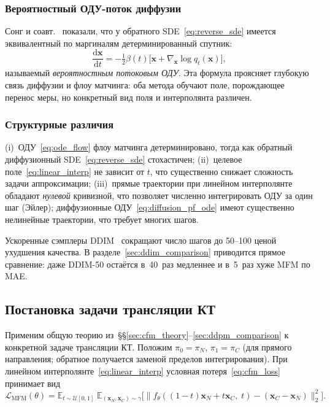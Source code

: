 \subsubsection{Вероятностный ОДУ-поток диффузии}

Сонг и соавт.~\cite{song2020score} показали, что у обратного SDE~\eqref{eq:reverse_sde} имеется эквивалентный по маргиналям детерминированный спутник:
\begin{equation}
    \frac{\mathrm{d}\mathbf{x}}{\mathrm{d}t} = -\tfrac{1}{2}\beta(t)\bigl[\mathbf{x} + \nabla_{\mathbf{x}}\log q_t(\mathbf{x})\bigr],
    \label{eq:diffusion_pf_ode}
\end{equation}
называемый \emph{вероятностным потоковым ОДУ}. Эта формула проясняет глубокую связь диффузии и флоу матчинга: оба метода обучают поле, порождающее перенос меры, но конкретный вид поля и интерполянта различен.

\subsubsection{Структурные различия}

\begin{note}
(i)~ОДУ~\eqref{eq:ode_flow} флоу матчинга детерминировано, тогда как обратный диффузионный SDE~\eqref{eq:reverse_sde} стохастичен; (ii)~целевое поле~\eqref{eq:linear_interp} не зависит от $t$, что существенно снижает сложность задачи аппроксимации; (iii)~прямые траектории при линейном интерполянте обладают \emph{нулевой} кривизной, что позволяет численно интегрировать ОДУ за один шаг (Эйлер); диффузионные ОДУ~\eqref{eq:diffusion_pf_ode} имеют существенно нелинейные траектории, что требует многих шагов.
\end{note}

Ускоренные сэмплеры DDIM~\cite{song2020denoising} сокращают число шагов до 50--100 ценой ухудшения качества. В разделе~\ref{sec:ddim_comparison} приводится прямое сравнение: даже DDIM-50 остаётся в~40~раз медленнее и в~5~раз хуже MFM по MAE.

\subsection{Постановка задачи трансляции КТ}

Применим общую теорию из~\S\S\ref{sec:cfm_theory}--\ref{sec:ddpm_comparison} к конкретной задаче трансляции КТ. Положим $\pi_0=\pi_N$, $\pi_1=\pi_C$ (для прямого направления; обратное получается заменой пределов интегрирования). При линейном интерполянте~\eqref{eq:linear_interp} условная потеря~\eqref{eq:cfm_loss} принимает вид
\begin{equation}
    \mathcal{L}_{\mathrm{MFM}}(\theta) =
    \mathbb{E}_{t\sim\mathcal{U}[0,1]}\;
    \mathbb{E}_{(\mathbf{x}_N,\mathbf{x}_C)\sim\gamma}
    \bigl[\lVert f_\theta\!\left((1-t)\mathbf{x}_N+t\mathbf{x}_C,\;t\right) - (\mathbf{x}_C-\mathbf{x}_N)\rVert_2^2\bigr].
    \label{eq:mfm_loss}
\end{equation}


